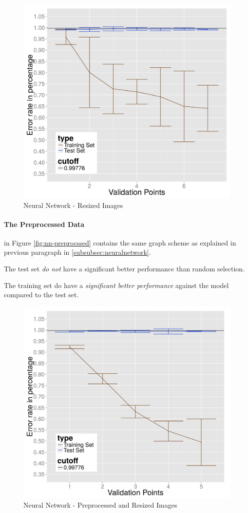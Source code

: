 \begin{figure}
  \centering
  \includegraphics[width=0.9\linewidth]{Images/DNNraw}
  \caption{Neural Network - Resized Images}
  \label{fig:nn-resized}
\end{figure}

\paragraph{The Preprocessed Data}
in Figure \ref{fig:nn-preprocssed} contains the same graph scheme as explained in previous paragraph in \ref{subsubsec:neuralnetwork}. 

The test set \emph{do not} have a significant better performance than random selection.

The training set do have a \emph{significant better performance} against the model compared to the test set.

\begin{figure}
  \centering
  \includegraphics[width=0.9\linewidth]{Images/DNNpreprocessed}
  \caption{Neural Network - Preprocessed and Resized Images}
  \label{fig:nn-preprocessed}
\end{figure}

